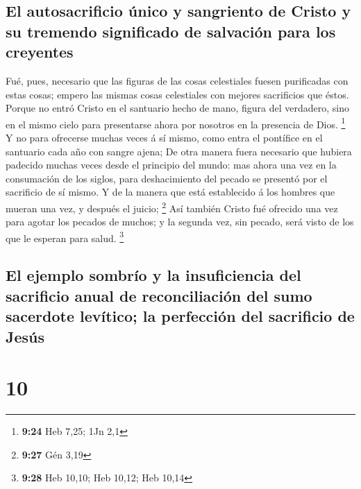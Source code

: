 \hypertarget{el-autosacrificio-uxfanico-y-sangriento-de-cristo-y-su-tremendo-significado-de-salvaciuxf3n-para-los-creyentes}{%
\subsection{El autosacrificio único y sangriento de Cristo y su tremendo
significado de salvación para los
creyentes}\label{el-autosacrificio-uxfanico-y-sangriento-de-cristo-y-su-tremendo-significado-de-salvaciuxf3n-para-los-creyentes}}

 Fué, pues, necesario que las figuras de las cosas
celestiales fuesen purificadas con estas cosas; empero las mismas cosas
celestiales con mejores sacrificios que éstos.  Porque no
entró Cristo en el santuario hecho de mano, figura del verdadero, sino
en el mismo cielo para presentarse ahora por nosotros en la presencia de
Dios. \footnote{\textbf{9:24} Heb 7,25; 1Jn 2,1}  Y no
para ofrecerse muchas veces á sí mismo, como entra el pontífice en el
santuario cada año con sangre ajena;  De otra manera
fuera necesario que hubiera padecido muchas veces desde el principio del
mundo: mas ahora una vez en la consumación de los siglos, para
deshacimiento del pecado se presentó por el sacrificio de sí mismo.
 Y de la manera que está establecido á los hombres que
mueran una vez, y después el juicio; \footnote{\textbf{9:27} Gén 3,19}
 Así también Cristo fué ofrecido una vez para agotar los
pecados de muchos; y la segunda vez, sin pecado, será visto de los que
le esperan para salud. \footnote{\textbf{9:28} Heb 10,10; Heb 10,12; Heb
  10,14}

\hypertarget{el-ejemplo-sombruxedo-y-la-insuficiencia-del-sacrificio-anual-de-reconciliaciuxf3n-del-sumo-sacerdote-levuxedtico-la-perfecciuxf3n-del-sacrificio-de-jesuxfas}{%
\subsection{El ejemplo sombrío y la insuficiencia del sacrificio anual
de reconciliación del sumo sacerdote levítico; la perfección del
sacrificio de
Jesús}\label{el-ejemplo-sombruxedo-y-la-insuficiencia-del-sacrificio-anual-de-reconciliaciuxf3n-del-sumo-sacerdote-levuxedtico-la-perfecciuxf3n-del-sacrificio-de-jesuxfas}}

\hypertarget{section-9}{%
\section{10}\label{section-9}}

